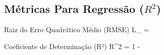 \subsection{Métricas Para Regressão ($R^2$)}

\begin{equacaodestaque}{Raiz do Erro Quadrático Médio (RMSE)}
    L_{} = 
    \label{eq:rmse}
\end{equacaodestaque}

\begin{equacaodestaque}{Coeficiente de Determinação (R²)}
    R^2 = 1 - 
    \label{eq:r_quadrado}
\end{equacaodestaque}


